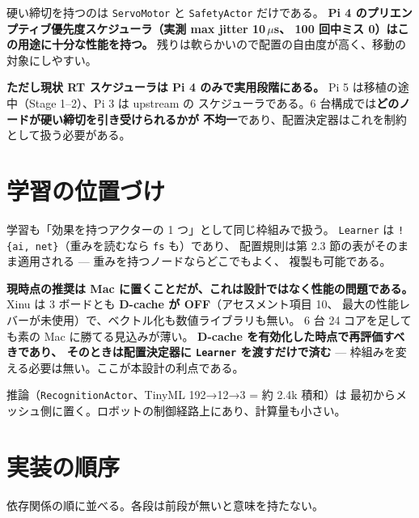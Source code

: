 \documentclass[11pt,a4paper]{article}
\newcommand{\code}[1]{\texttt{#1}}
\newcommand{\prob}[1]{\textbf{\textcolor{red!55!black}{#1}}}
\begin{document}
硬い締切を持つのは \code{ServoMotor} と \code{SafetyActor} だけである。
\textbf{Pi 4 のプリエンプティブ優先度スケジューラ（実測 max jitter 10\,$\mu$s、
100 回中ミス 0）はこの用途に十分な性能を持つ。}
残りは軟らかいので配置の自由度が高く、移動の対象にしやすい。

\prob{ただし現状 RT スケジューラは Pi 4 のみで実用段階にある。}
Pi 5 は移植の途中（Stage 1--2）、Pi 3 は upstream の
スケジューラである。6 台構成では\textbf{どのノードが硬い締切を引き受けられるかが
不均一}であり、配置決定器はこれを制約として扱う必要がある。

\section{学習の位置づけ}

学習も「効果を持つアクターの 1 つ」として同じ枠組みで扱う。
\code{Learner} は \code{!\{ai, net\}}（重みを読むなら \code{fs} も）であり、
配置規則は第 2.3 節の表がそのまま適用される --- 重みを持つノードならどこでもよく、
複製も可能である。

\textbf{現時点の推奨は Mac に置くことだが、これは設計ではなく性能の問題である。}
Xinu は 3 ボードとも \prob{D-cache が OFF}（アセスメント項目 10、
最大の性能レバーが未使用）で、ベクトル化も数値ライブラリも無い。
6 台 24 コアを足しても素の Mac に勝てる見込みが薄い。
\textbf{D-cache を有効化した時点で再評価すべきであり、
そのときは配置決定器に \code{Learner} を渡すだけで済む} ---
枠組みを変える必要は無い。ここが本設計の利点である。

推論（\code{RecognitionActor}、TinyML 192→12→3 = 約 2.4k 積和）は
最初からメッシュ側に置く。ロボットの制御経路上にあり、計算量も小さい。

\section{実装の順序}

依存関係の順に並べる。各段は前段が無いと意味を持たない。
\end{document}
